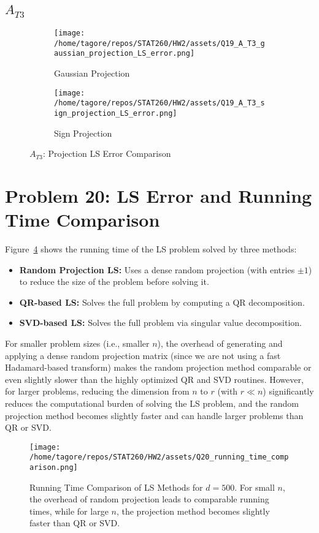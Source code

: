 \documentclass{article}
\begin{document}
\subsection*{\(A_{T3}\)}
\begin{figure}[H]
    \centering
    \begin{subfigure}[b]{0.48\textwidth}
        \centering
        \texttt{[image: /home/tagore/repos/STAT260/HW2/assets/Q19\_A\_T3\_gaussian\_projection\_LS\_error.png]}
        \caption{Gaussian Projection}
        \label{fig:Q19_AT3_gaussian}
    \end{subfigure}
    \hfill
    \begin{subfigure}[b]{0.48\textwidth}
        \centering
        \texttt{[image: /home/tagore/repos/STAT260/HW2/assets/Q19\_A\_T3\_sign\_projection\_LS\_error.png]}
        \caption{Sign Projection}
        \label{fig:Q19_AT3_sign}
    \end{subfigure}
    \caption{\(A_{T3}\): Projection LS Error Comparison}
    \label{fig:Q19_AT3}
\end{figure}


\section*{Problem 20: LS Error and Running Time Comparison}

Figure~\ref{fig:running_time} shows the running time of the LS problem solved by three methods:
\begin{itemize}
    \item \textbf{Random Projection LS:} Uses a dense random projection (with entries $\pm1$) to reduce the size of the problem before solving it.
    \item \textbf{QR-based LS:} Solves the full problem by computing a QR decomposition.
    \item \textbf{SVD-based LS:} Solves the full problem via singular value decomposition.
\end{itemize}

For smaller problem sizes (i.e., smaller $n$), the overhead of generating and applying a dense random projection matrix (since we are not using a fast Hadamard-based transform) makes the random projection method comparable or even slightly slower than the highly optimized QR and SVD routines. However, for larger problems, reducing the dimension from $n$ to $r$ (with $r\ll n$) significantly reduces the computational burden of solving the LS problem, and the random projection method becomes slightly faster and can handle larger problems than QR or SVD.

\begin{figure}[H]
    \centering
    \texttt{[image: /home/tagore/repos/STAT260/HW2/assets/Q20\_running\_time\_comparison.png]}
    \caption{Running Time Comparison of LS Methods for $d=500$. For small $n$, the overhead of random projection leads to comparable running times, while for large $n$, the projection method becomes slightly faster than QR or SVD.}
    \label{fig:running_time}
\end{figure}
\end{document}
